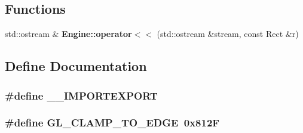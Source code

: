 \subsection*{Functions}
\begin{CompactItemize}
\item 
std::ostream \& {\bf Engine::operator$<$$<$} (std::ostream \&stream, const Rect \&r)
\end{CompactItemize}


\subsection{Define Documentation}
\subsubsection{\setlength{\rightskip}{0pt plus 5cm}\#define \_\-\_\-IMPORTEXPORT}\label{com__typedefs_8h_07a1eb4568b752b291014924a13ba72b}


\subsubsection{\setlength{\rightskip}{0pt plus 5cm}\#define GL\_\-CLAMP\_\-TO\_\-EDGE~0x812F}\label{com__typedefs_8h_e90f81f48642444b4ba7fa5cacf40569}


